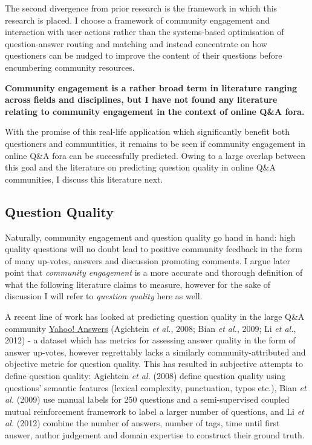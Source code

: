 \documentclass[11pt,preprint, authoryear]{article}
\numberwithin{equation}{section}
\begin{document}
The second divergence from prior research is the framework in which this
research is placed. I choose a framework of community engagement and
interaction with user actions rather than the systems-based optimisation
of question-answer routing and matching and instead concentrate on how
questioners can be nudged to improve the content of their questions
before encumbering community resources.

\textbf{Community engagement is a rather broad term in literature
ranging across fields and disciplines, but I have not found any
literature relating to community engagement in the context of online
Q\&A fora.}

With the promise of this real-life application which significantly
benefit both questioners and communtities, it remains to be seen if
community engagement in online Q\&A fora can be successfully predicted.
Owing to a large overlap between this goal and the literature on
predicting question quality in online Q\&A communities, I discuss this
literature next.

\subsection{Question Quality}\label{question-quality}

Naturally, community engagement and question quality go hand in hand:
high quality questions will no doubt lead to positive community feedback
in the form of many up-votes, answers and discussion promoting comments.
I argue later point that \emph{community engagement} is a more accurate
and thorough definition of what the following literature claims to
measure, however for the sake of discussion I will refer to
\emph{question quality} here as well.

A recent line of work has looked at predicting question quality in the
large Q\&A community \href{http://answers.yahoo.com}{Yahoo! Answers}
(Agichtein \emph{et al.}, 2008; Bian \emph{et al.}, 2009; Li \emph{et
al.}, 2012) - a dataset which has metrics for assessing answer quality
in the form of answer up-votes, however regrettably lacks a similarly
community-attributed and objective metric for question quality. This has
resulted in subjective attempts to define question quality: Agichtein
\emph{et al.} (2008) define question quality using questions' semantic
features (lexical complexity, punctuation, typos etc.), Bian \emph{et
al.} (2009) use manual labels for 250 questions and a semi-supervised
coupled mutual reinforcement framework to label a larger number of
questions, and Li \emph{et al.} (2012) combine the number of answers,
number of tags, time until first answer, author judgement and domain
expertise to construct their ground truth.
\end{document}
